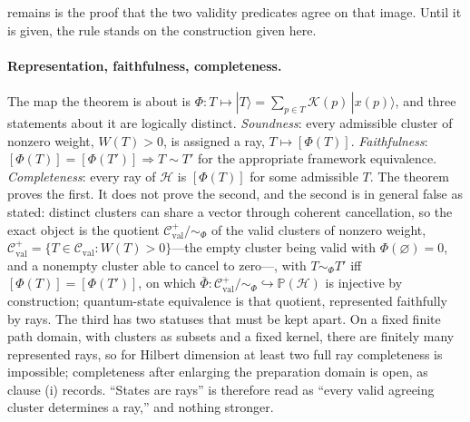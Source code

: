 remains is the proof that the two validity predicates agree on that image. Until it is given, the rule stands on the construction given here.

\paragraph{Representation, faithfulness, completeness.} The map the theorem is about is $\Phi : T \mapsto |T\rangle = \sum_{p \in T} \mathcal{K}(p)\,|x(p)\rangle$, and three statements about it are logically distinct. \emph{Soundness}: every admissible cluster of nonzero weight, $W(T) > 0$, is assigned a ray, $T \mapsto [\Phi(T)]$. \emph{Faithfulness}: $[\Phi(T)] = [\Phi(T')] \Rightarrow T \sim T'$ for the appropriate framework equivalence. \emph{Completeness}: every ray of $\mathcal{H}$ is $[\Phi(T)]$ for some admissible $T$. The theorem proves the first. It does not prove the second, and the second is in general false as stated: distinct clusters can share a vector through coherent cancellation, so the exact object is the quotient $\mathcal{C}^{+}_{\mathrm{val}}/\!\sim_{\Phi}$ of the valid clusters of nonzero weight, $\mathcal{C}^{+}_{\mathrm{val}} = \{T \in \mathcal{C}_{\mathrm{val}} : W(T) > 0\}$---the empty cluster being valid with $\Phi(\varnothing) = 0$, and a nonempty cluster able to cancel to zero---, with $T \sim_{\Phi} T'$ iff $[\Phi(T)] = [\Phi(T')]$, on which $\bar{\Phi} : \mathcal{C}^{+}_{\mathrm{val}}/\!\sim_{\Phi} \hookrightarrow \mathbb{P}(\mathcal{H})$ is injective by construction; quantum-state equivalence is that quotient, represented faithfully by rays. The third has two statuses that must be kept apart. On a fixed finite path domain, with clusters as subsets and a fixed kernel, there are finitely many represented rays, so for Hilbert dimension at least two full ray completeness is impossible; completeness after enlarging the preparation domain is open, as clause (i) records. ``States are rays'' is therefore read as ``every valid agreeing cluster determines a ray,'' and nothing stronger.

